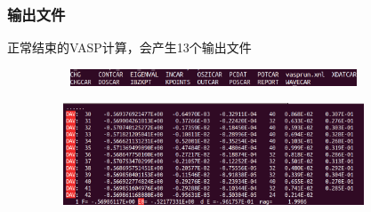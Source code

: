 \frame
{
	\frametitle{输出文件}
正常结束的\textrm{VASP}计算，会产生13个输出文件%
\begin{figure}[h!]
\centering
\vskip -2pt
\includegraphics[height=0.20in,width=4.0in,viewport=0 2 750 38,clip]{Figures/Pt_atom-lsout.png}
\caption{\fontsize{6.2pt}{5.2pt}}%
\label{Pt_atom:lsout}
\end{figure}

{\fontsize{7.5pt}{5.2pt}}%
\begin{figure}[h!]
\centering
\includegraphics[height=1.2in,width=4.0in,viewport=0 0 880 290,clip]{Figures/Pt_atom-OSZICAR.png}
\caption{\fontsize{6.2pt}{5.2pt}}%
\label{Pt_atom:OSZICAR}
\end{figure}
}

